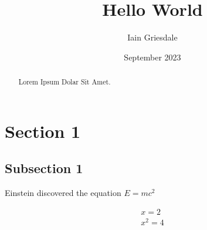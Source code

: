 \documentclass[titlepage]{article}
\title{Hello World}
\author{Iain Griesdale}
\date{September 2023}
\begin{document}
\maketitle

\begin{abstract}
    Lorem Ipsum Dolar Sit Amet.
\end{abstract}

\section{Section 1}

\subsection{Subsection 1}

Einstein discovered the equation $E=mc^2$

\begin{equation}
    \begin{split}
        x=2 \\
        x^2=4
    \end{split}
\end{equation}
\end{document}

